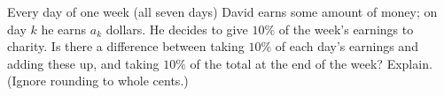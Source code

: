 Every day of one week (all seven days) David earns some amount of money; on day $k$ he earns $a_k$ dollars. He decides to give $10\%$ of the week's earnings to charity. Is there a difference between taking $10\%$ of each day's earnings and adding these up, and taking $10\%$ of the total at the end of the week? Explain. (Ignore rounding to whole cents.)
